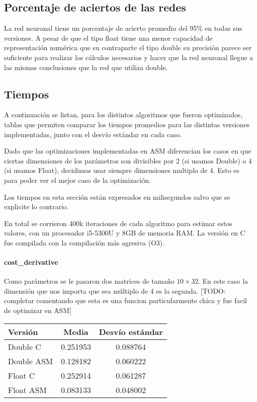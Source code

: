 \subsection{Porcentaje de aciertos de las redes}

La red neuronal tiene un porcentaje de acierto promedio del 95\% en todas sus versiones. A pesar de que el tipo float tiene una menor capacidad de representación numérica que su contraparte el tipo double su precisión parece ser suficiente para realizar los cálculos necesarios y hacer que la red neuronal llegue a las mismas conclusiones que la red que utiliza double.

\subsection{Tiempos}

A continuación se listan, para los distintos algoritmos que fueron optimizados, tablas que permiten comparar los tiempos promedios para las distintas versiones implementadas, junto con el desvío estándar en cada caso.

Dado que las optimizaciones implementadas en ASM diferencian los casos en que ciertas dimensiones de los parámetros son divisibles por 2 (si usamos Double) o 4 (si usamos Float), decidimos usar siempre dimensiones multiplo de 4. Esto es para poder ver el mejor caso de la optimización.

Los tiempos en esta sección están expresados en milisegundos salvo que se explicite lo contrario.

En total se corrieron 400k iteraciones de cada algoritmo para estimar estos valores, con un procesador i5-5300U y 8GB de memoria RAM. La versión en C fue compilada con la compilación más agresiva (O3).

\paragraph{cost\_derivative}

Como parámetros se le pasaron dos matrices de tamaño $10\times32$. En este caso la dimensión que nos importa que sea múltiplo de 4 es la segunda. [TODO: completar comentando que esta es una funcion particularmente chica y fue facil de optimizar en ASM]

\begin{center}
    \begin{tabular}{| l | c | c |}
                \hline
    Versión & Media & Desvío estándar \\
                \hline
    Double C & 0.251953 & 0.088764 \\
    Double ASM & 0.128182 & 0.060222 \\
    Float C & 0.252914 & 0.061287 \\
    Float ASM  & 0.083133 & 0.048002 \\
                \hline
			
        \end{tabular}
\end{center}

